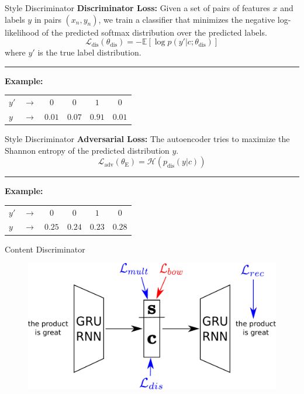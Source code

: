 \documentclass[aspectratio=169]{beamer}
\newcommand{\loss}[1]{\mathcal{L}_{\text{#1}}}
\newcommand{\param}[1]{\theta_{\text{#1}}}
\begin{document}
\begin{frame}{Style Discriminator}
	\textbf{Discriminator Loss:}
	Given a set of pairs of features $x$ and labels $y$ in pairs $(x_n, y_n)$, we train a classifier that minimizes the negative log-likelihood of the predicted softmax distribution over the predicted labels.
	\begin{equation*}
		\loss{dis}(\param{dis}) = - \mathbb{E} [\log p(y'|c;\param{dis})]
	\end{equation*}
	where $y'$ is the true label distribution.

	\noindent\rule{\textwidth}{0.5pt}

	\centering
	\textbf{Example:}
	\begin{tabular}{ l  c | c | c | c | c |}
		\cline{3-6}
		$y'$ & $\rightarrow$ & $0$    & $0$    & $1$    & $0$    \\
		\cline{3-6}
		$y$  & $\rightarrow$ & $0.01$ & $0.07$ & $0.91$ & $0.01$ \\
		\cline{3-6}
	\end{tabular}
\end{frame}

\begin{frame}{Style Discriminator}
	\textbf{Adversarial Loss:}
	The autoencoder tries to maximize the Shannon entropy of the predicted distribution $y$.
	\begin{equation*}
		\loss{adv}(\param{E}) = \mathcal{H}(p_\text{dis}(y|c))
	\end{equation*}

	\noindent\rule{\textwidth}{0.5pt}

	\centering
	\textbf{Example:}
	\begin{tabular}{ l  c | c | c | c | c |}
		\cline{3-6}
		$y'$ & $\rightarrow$ & $0$    & $0$    & $1$    & $0$    \\
		\cline{3-6}
		$y$  & $\rightarrow$ & $0.25$ & $0.24$ & $0.23$ & $0.28$ \\
		\cline{3-6}
	\end{tabular}
\end{frame}

\begin{frame}{Content Discriminator}
	\centering
	\begin{figure}[ht]
		\includegraphics[width=\textwidth]{images/overview-training-4}
	\end{figure}
\end{frame}
\end{document}
